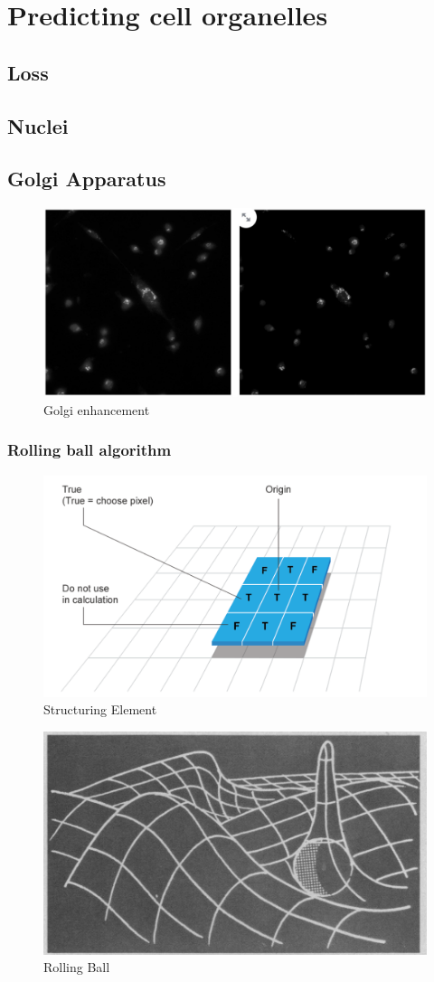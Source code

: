 \section{Predicting cell organelles}
\subsection{Loss}
\subsection{Nuclei}
\subsection{Golgi Apparatus}
\begin{figure}[htb]
	\begin{center}
		\includegraphics[width=0.5\linewidth]{bilder/enhancement.jpg}
		\caption{Golgi enhancement}\label{fig:golgi-enhancement}
	\end{center}
\end{figure}

\subsubsection{Rolling ball algorithm}
\begin{figure}[htb]
	\begin{center}
		\includegraphics[width=0.5\linewidth]{bilder/structuring-element.png}
		\caption{Structuring Element}\label{fig:structuring-element}
	\end{center}
\end{figure}
\begin{figure}[htb]
	\begin{center}
		\includegraphics[width=0.5\linewidth]{bilder/rolling-ball.png}
		\caption{Rolling Ball}\label{fig:rolling-ball}
	\end{center}
\end{figure}

